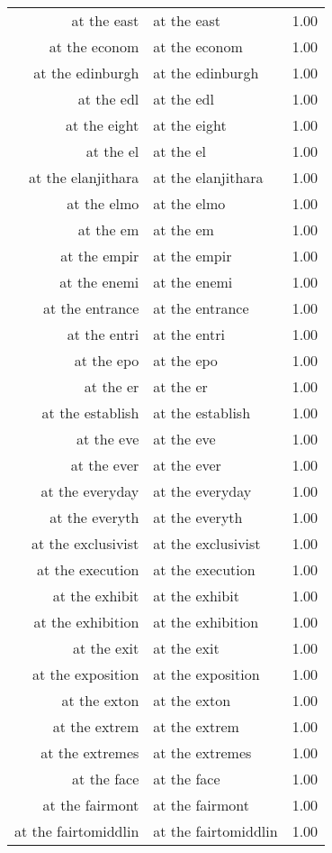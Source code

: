 \begin{table}[ht]
\begin{tabular}{rlr}
  at the east & at the east & 1.00 \\ 
  at the econom & at the econom & 1.00 \\ 
  at the edinburgh & at the edinburgh & 1.00 \\ 
  at the edl & at the edl & 1.00 \\ 
  at the eight & at the eight & 1.00 \\ 
  at the el & at the el & 1.00 \\ 
  at the elanjithara & at the elanjithara & 1.00 \\ 
  at the elmo & at the elmo & 1.00 \\ 
  at the em & at the em & 1.00 \\ 
  at the empir & at the empir & 1.00 \\ 
  at the enemi & at the enemi & 1.00 \\ 
  at the entrance & at the entrance & 1.00 \\ 
  at the entri & at the entri & 1.00 \\ 
  at the epo & at the epo & 1.00 \\ 
  at the er & at the er & 1.00 \\ 
  at the establish & at the establish & 1.00 \\ 
  at the eve & at the eve & 1.00 \\ 
  at the ever & at the ever & 1.00 \\ 
  at the everyday & at the everyday & 1.00 \\ 
  at the everyth & at the everyth & 1.00 \\ 
  at the exclusivist & at the exclusivist & 1.00 \\ 
  at the execution & at the execution & 1.00 \\ 
  at the exhibit & at the exhibit & 1.00 \\ 
  at the exhibition & at the exhibition & 1.00 \\ 
  at the exit & at the exit & 1.00 \\ 
  at the exposition & at the exposition & 1.00 \\ 
  at the exton & at the exton & 1.00 \\ 
  at the extrem & at the extrem & 1.00 \\ 
  at the extremes & at the extremes & 1.00 \\ 
  at the face & at the face & 1.00 \\ 
  at the fairmont & at the fairmont & 1.00 \\ 
  at the fairtomiddlin & at the fairtomiddlin & 1.00 \\ 

\end{tabular}
\end{table}
